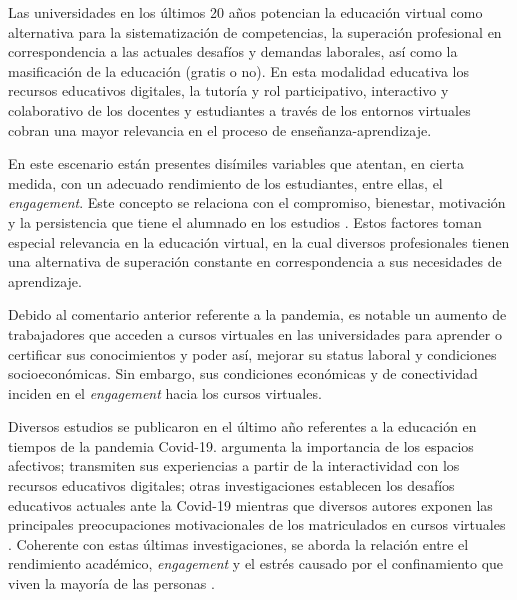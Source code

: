 \documentclass[spanish]{textolivre}
\begin{document}
Las universidades en los últimos 20 años potencian la educación virtual como alternativa para la sistematización de competencias, la superación profesional en correspondencia a las actuales desafíos y demandas laborales, así como la masificación de la educación (gratis o no). En esta modalidad educativa los recursos educativos digitales, la tutoría y rol participativo, interactivo y colaborativo de los docentes y estudiantes a través de los entornos virtuales cobran una mayor relevancia en el proceso de enseñanza-aprendizaje.

En este escenario están presentes disímiles variables que atentan, en cierta medida, con un adecuado rendimiento de los estudiantes, entre ellas, el \emph{engagement}. Este concepto se relaciona con el compromiso, bienestar, motivación y la persistencia que tiene el alumnado en los estudios \cite{schaufeli2002}. %
Estos factores toman especial relevancia en la educación virtual, en la cual diversos profesionales tienen una alternativa de superación constante en correspondencia a sus necesidades de aprendizaje.

Debido al comentario anterior referente a la pandemia, es notable un aumento de trabajadores que acceden a cursos virtuales en las universidades para aprender o certificar sus conocimientos y poder así, mejorar su status laboral y condiciones socioeconómicas. Sin embargo, sus condiciones económicas y de conectividad inciden en el \emph{engagement} hacia los cursos virtuales.

Diversos estudios se publicaron en el último año referentes a la educación en tiempos de la pandemia Covid-19. \textcite{cacerespinaloza2020} %
argumenta la importancia de los espacios afectivos; \textcite{kemmekah2020, jordan2020, lin2020, hernandezramos2021} %
transmiten sus experiencias a partir de la interactividad con los recursos educativos digitales; otras investigaciones establecen los desafíos educativos actuales ante la Covid-19 \cite{baptistalucio2020, miguel2020, floresnessi2020, velasquez2020, jimenez2021} %
mientras que diversos autores exponen las principales preocupaciones motivacionales de los matriculados en cursos virtuales \cite{diazguillen2018, ojeda2020, valdivieso2020, gonzalez2020}. %
Coherente con estas últimas investigaciones, se aborda la relación entre el rendimiento académico, \emph{engagement} y el estrés causado por el confinamiento que viven la mayoría de las personas \cite{alvarezherrero-hernandez2020, hernandez2020, mahdy2020, valdivieso2020, santiagoiglesias2021}. %
\end{document}
